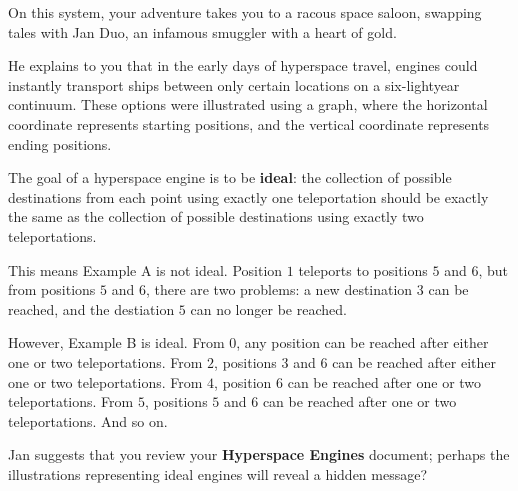 On this system, your adventure takes you to a racous space saloon, swapping tales
with Jan Duo, an infamous smuggler with a heart of gold.

He explains to you that in the early days of hyperspace travel, engines could
instantly transport ships between only certain locations on a six-lightyear continuum.
These options were illustrated using a graph, where the horizontal coordinate
represents starting positions, and the vertical coordinate represents ending positions.


The goal of a hyperspace engine is to be \textbf{ideal}: the collection of possible
destinations from each point using exactly one teleportation should be exactly the 
same as the collection of possible destinations using exactly two teleportations.

This means Example A is not ideal. Position \(1\) teleports to
positions \(5\) and \(6\), but from positions \(5\) and \(6\), there are two
problems: a new destination \(3\) can be reached, and the destiation \(5\) can
no longer be reached.

However, Example B is ideal. From \(0\), any position can be reached after either
one or two teleportations. From \(2\), positions \(3\) and \(6\) can be reached
after either one or two teleportations. From \(4\), position \(6\) can be reached
after one or two teleportations. From \(5\), positions \(5\) and \(6\) can be
reached after one or two teleportations. And so on.

Jan suggests that you review your \textbf{Hyperspace Engines} document;
perhaps the illustrations representing ideal engines will reveal a hidden message?

